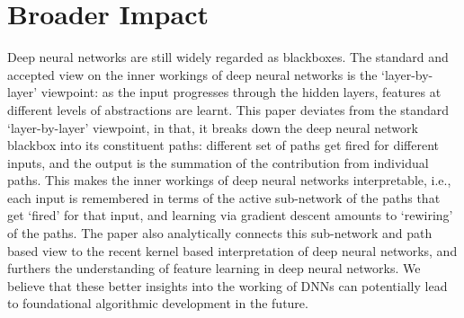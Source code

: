 \section{Broader Impact}
Deep neural networks are still widely regarded as blackboxes. The standard and accepted view on the inner workings of  deep neural networks is the `layer-by-layer' viewpoint:  as the input progresses through the hidden layers, features at different levels of abstractions are learnt. This paper deviates from the standard `layer-by-layer' viewpoint, in that, it breaks down the deep neural network blackbox into its constituent paths: different set of paths get fired for different inputs, and the output is the summation of the contribution from individual paths. This makes the inner workings of deep neural networks interpretable, i.e., each input is remembered in terms of the active sub-network of the paths that get `fired' for that input, and learning via gradient descent amounts to `rewiring' of the paths. The paper also analytically connects this sub-network and path based view to the recent kernel based interpretation of deep neural networks, and furthers the understanding of feature learning in deep neural networks. We believe that these better insights into the working of DNNs  can potentially lead to foundational algorithmic development in the future.

